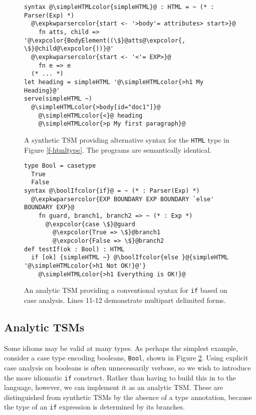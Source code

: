 \documentclass{sig-alternate}
\newcommand{\expkwparsercolor}[1]{\textcolor[HTML]{336699}{#1}}
\newcommand{\expcolor}[1]{\textcolor[HTML]{FF0033}{#1}}
\newcommand{\simpleHTMLcolor}[1]{\textcolor[HTML]{7D5100}{#1}}
\newcommand{\boolIfcolor}[1]{\textcolor[HTML]{5E0C0C}{#1}}
\newcommand{\mycaption}[1]{\vspace{-4px}\caption{#1}\vspace{-2px}}
\begin{document}


\begin{figure}[t]
\begin{lstlisting}[style=wyvern]
syntax @\simpleHTMLcolor{simpleHTML}@ : HTML = ~ (* : Parser(Exp) *)
  @\expkwparsercolor{start <- '>body'= attributes> start>}@
    fn atts, child => '@\expcolor{BodyElement((\$}@atts@\expcolor{, \$}@child@\expcolor{))}@'
  @\expkwparsercolor{start <- '<'= EXP>}@
    fn e => e
  (* ... *)
let heading = simpleHTML '@\simpleHTMLcolor{>h1 My Heading}@'
serve(simpleHTML ~)
  @\simpleHTMLcolor{>body[id="doc1"]}@
    @\simpleHTMLcolor{<}@ heading
    @\simpleHTMLcolor{>p My first paragraph}@
\end{lstlisting}
\mycaption{A synthetic TSM providing alternative syntax for the \texttt{HTML} type in Figure \ref{f-htmltype}. The programs are semantically identical.}
\label{f-simplehtml}
\end{figure}
\begin{figure}[t]
\begin{lstlisting}[style=wyvern]
type Bool = casetype 
  True
  False
syntax @\boolIfcolor{if}@ = ~ (* : Parser(Exp) *)
  @\expkwparsercolor{EXP BOUNDARY EXP BOUNDARY `else' BOUNDARY EXP}@
    fn guard, branch1, branch2 => ~ (* : Exp *)
      @\expcolor{case \$}@guard
        @\expcolor{True => \$}@branch1
        @\expcolor{False => \$}@branch2
def testIf(ok : Bool) : HTML
  if [ok] {simpleHTML ~} @\boolIfcolor{else }@{simpleHTML '@\simpleHTMLcolor{>h1 Not OK!}@'}
    @\simpleHTMLcolor{>h1 Everything is OK!}@
\end{lstlisting}
\mycaption{An analytic TSM providing a conventional syntax for \texttt{if} based on case analysis. Lines 11-12 demonstrate multipart delimited forms.}
\label{if-example}
\end{figure}

\subsection{Analytic TSMs}
Some idioms may be valid at many types. As perhaps the simplest example, consider a case type encoding booleans, \verb|Bool|, shown in Figure \ref{if-example}. Using explicit case analysis on booleans is often unnecessarily verbose, so we wish to introduce the more idiomatic \verb|if| construct. Rather than having to build this in to the language, however, we can implement it as an analytic TSM. These are distinguished from synthetic TSMs by the absence of a type annotation, because the type of an \verb|if| expression is determined by its branches. 
\end{document}
